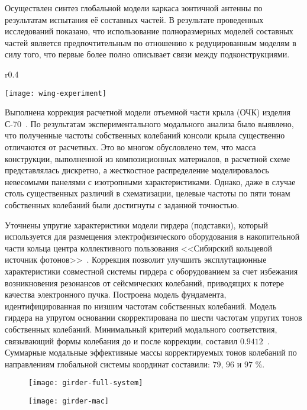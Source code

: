 Осуществлен синтез глобальной модели каркаса зонтичной антенны по результатам испытания её составных частей. В результате проведенных исследований показано, что использование полноразмерных моделей составных частей является предпочтительным по отношению к редуцированным моделям в силу того, что первые более полно описывает связи между подконструкциями.

\begin{wrapfigure}[11]{r}{0.4\textwidth}
	\begin{center}
		\vspace{-5em}
		\texttt{[image: wing-experiment]} 
		 \label{fig:wing-experiment}
	\end{center}
\end{wrapfigure}

Выполнена коррекция расчетной модели отъемной части крыла (ОЧК) изделия \mbox{С-70}~. По результатам экспериментального модального анализа было выявлено, что полученные частоты собственных колебаний консоли крыла существенно отличаются от расчетных. Это во многом обусловлено тем, что масса конструкции, выполненной из композиционных материалов, в расчетной схеме представлялась дискретно, а жесткостное распределение моделировалось невесомыми панелями с изотропными характеристиками. Однако, даже в случае столь существенных различий в схематизации, целевые частоты по пяти тонам собственных колебаний были достигнуты с заданной точностью. 

Уточнены упругие характеристики модели гирдера (подставки), который используется для размещения электрофизического оборудования в накопительной части кольца центра коллективного пользования <<Сибирский кольцевой источник фотонов>>~. Коррекция позволит улучшить эксплутационные характеристики совместной системы гирдера с оборудованием за счет избежания возникновения резонансов от сейсмических колебаний, приводящих к потере качества электронного пучка. Построена модель фундамента, идентифицированная по низшим частотам собственных колебаний. Модель гирдера на упругом основании скорректирована по шести частотам упругих тонов собственных колебаний. Минимальный критерий модального соответствия, связывающий формы колебания до и после коррекции, составил $ 0.9412 $~. Суммарные модальные эффективные массы корректируемых тонов колебаний по направлениям глобальной системы координат составили: $ 79 $, $ 96 $ и $ 97 $ \%. 

\begin{figure}[!htb]
	\centering
	\vspace{-0.5em}
	\begin{minipage}{0.5\textwidth}
		\centering
		\texttt{[image: girder-full-system]} 
		 \label{fig:girder-experiment}
	\end{minipage}
	\hfill
	\begin{minipage}{0.435\textwidth}
		\centering
		\texttt{[image: girder-mac]}
		 \label{fig:girder-mac}
	\end{minipage}
\end{figure}